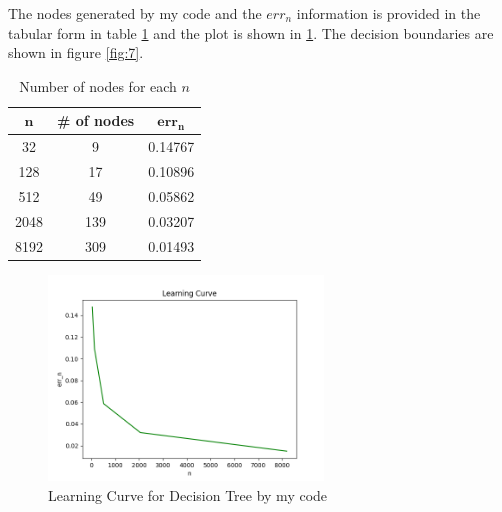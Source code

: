 \documentclass[a4paper]{article}
\theoremstyle{definition}
\newenvironment{soln}{
    \leavevmode\color{blue}\ignorespaces
}{}
\begin{document}
\begin{enumerate}
  \begin{soln}
      The nodes generated by my code and the $err_n$ information is provided in the tabular form in table \ref{tab:2} and the plot is shown in \ref{fig:6}.
      The decision boundaries are shown in figure \ref{fig:7}.

      \begin{table}[H]
          \centering
          \begin{tabular}{|c|c|c|}
              \hline
              $\mathbf{n}$ & \textbf{\# of nodes} & $\mathbf{err_n}$ \\
              \hline
              32 & 9 & 0.14767 \\
              \hline
              128 & 17 & 0.10896 \\
              \hline
              512 & 49 & 0.05862 \\
              \hline
              2048 & 139 & 0.03207 \\
              \hline
              8192 & 309 & 0.01493 \\
              \hline
          \end{tabular}
          \caption{Number of nodes for each $n$}
          \label{tab:2}
      \end{table}

    \begin{figure}[H]
        \centering
        \includegraphics[width=0.65\textwidth]{err_n.png}
        \caption{Learning Curve for Decision Tree by my code}
        \label{fig:6}
    \end{figure}


\end{soln}
\end{enumerate}
\end{document}
